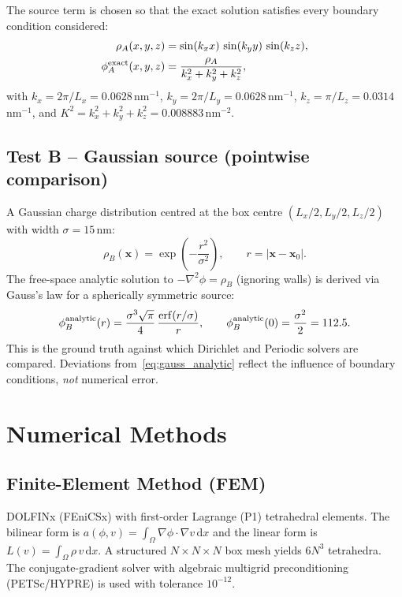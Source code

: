 \documentclass[11pt,a4paper]{article}
\begin{document}
The source term is chosen so that the exact solution satisfies every
boundary condition considered:
\begin{align}
  \rho_A(x,y,z) &= \sin(k_x x)\,\sin(k_y y)\,\sin(k_z z),\\
  \phi_A^{\rm exact}(x,y,z) &= \frac{\rho_A}{k_x^2+k_y^2+k_z^2},
\end{align}
with $k_x = 2\pi/L_x = 0.0628$\,nm$^{-1}$,
$k_y = 2\pi/L_y = 0.0628$\,nm$^{-1}$,
$k_z = \pi/L_z = 0.0314$\,nm$^{-1}$, and
$K^2 = k_x^2+k_y^2+k_z^2 = 0.008883$\,nm$^{-2}$.

\subsection{Test B -- Gaussian source (pointwise comparison)}

A Gaussian charge distribution centred at the box centre
$(L_x/2,L_y/2,L_z/2)$ with width $\sigma = 15$\,nm:
\begin{equation}
  \rho_B(\mathbf{x}) = \exp\!\left(-\frac{r^2}{\sigma^2}\right),
  \qquad r = |\mathbf{x} - \mathbf{x}_0|.
\end{equation}
The free-space analytic solution to $-\nabla^2\phi = \rho_B$ (ignoring walls)
is derived via Gauss's law for a spherically symmetric source:
\begin{equation}
  \phi_B^{\rm analytic}(r) = \frac{\sigma^3\sqrt{\pi}}{4}\,
  \frac{\operatorname{erf}(r/\sigma)}{r},
  \qquad
  \phi_B^{\rm analytic}(0) = \frac{\sigma^2}{2} = 112.5.
  \label{eq:gauss_analytic}
\end{equation}
This is the ground truth against which Dirichlet and Periodic solvers
are compared.  Deviations from~\eqref{eq:gauss_analytic} reflect the
influence of boundary conditions, \emph{not} numerical error.

\section{Numerical Methods}

\subsection{Finite-Element Method (FEM)}
DOLFINx (FEniCSx) with first-order Lagrange (P1) tetrahedral elements.
The bilinear form is
$a(\phi,v) = \int_\Omega \nabla\phi \cdot \nabla v\,\mathrm{d}x$
and the linear form is
$L(v) = \int_\Omega \rho\,v\,\mathrm{d}x$.
A structured $N\times N\times N$ box mesh yields $6N^3$ tetrahedra.
The conjugate-gradient solver with algebraic multigrid preconditioning
(PETSc/HYPRE) is used with tolerance $10^{-12}$.
\end{document}
